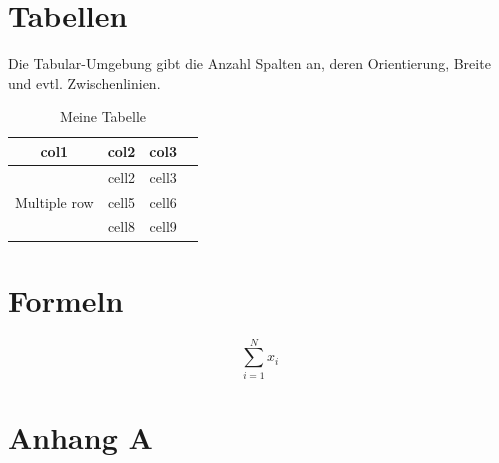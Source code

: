 \documentclass[12pt,oneside]{article}
\begin{document}
\section{Tabellen}

Die Tabular-Umgebung gibt die Anzahl Spalten an, deren Orientierung, Breite und evtl. Zwischenlinien. 


\begin{table}[ht]
    \centering
    \caption{Meine Tabelle}
        \begin{tabular}{ cccc } 
        \toprule
        col1 & col2 & col3 \\
        \midrule
        \multirow{3}{4em}{Multiple row} & cell2 & cell3 \\ 
        & cell5 & cell6 \\ 
        & cell8 & cell9 \\ 
        \bottomrule
    \end{tabular}
    \label{tab:countries}
\end{table}

\section{Formeln}

\begin{equation}
    \sum_{i=1}^N x_i
    \label{eq:1}
\end{equation}



\clearpage
\lhead{}
\printbibliography
{}


\clearpage
\appendix
\section{Anhang A}


\end{document}
